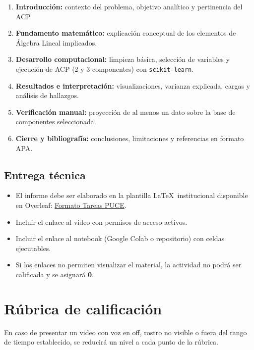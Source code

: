 \documentclass[a4,11pt]{aleph-notas}
\begin{document}
\begin{enumerate}[leftmargin=*, label={\textbf{\arabic*.}}]
\item \textbf{Introducción:} contexto del problema, objetivo analítico y pertinencia del ACP.
\item \textbf{Fundamento matemático:} explicación conceptual de los elementos de Álgebra Lineal implicados.
\item \textbf{Desarrollo computacional:} limpieza básica, selección de variables y ejecución de ACP (2 y 3 componentes) con \texttt{scikit-learn}.
\item \textbf{Resultados e interpretación:} visualizaciones, varianza explicada, cargas y análisis de hallazgos.
\item \textbf{Verificación manual:} proyección de al menos un dato sobre la base de componentes seleccionada.
\item \textbf{Cierre y bibliografía:} conclusiones, limitaciones y referencias en formato APA.
\end{enumerate}

\subsection{Entrega técnica}
\begin{itemize}[leftmargin=*]
\item El informe debe ser elaborado en la plantilla \LaTeX\ institucional disponible en Overleaf: \href{https://www.overleaf.com/latex/templates/formato-tareas-puce/nkgwqjtcrvms}{Formato Tareas PUCE}.
\item Incluir el enlace al video con permisos de acceso activos.
\item Incluir el enlace al notebook (Google Colab o repositorio) con celdas ejecutables.
\item Si los enlaces no permiten visualizar el material, la actividad no podrá ser calificada y se asignará \textbf{0}.
\end{itemize}

\section{Rúbrica de calificación}

En caso de presentar un video con voz en off, rostro no visible o fuera del rango de tiempo establecido, se reducirá un nivel a cada punto de la rúbrica.
\end{document}
